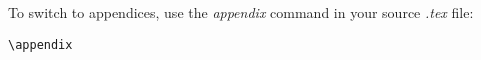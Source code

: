 To switch to appendices, use the \emph{appendix} command in your source \emph{.tex} file:

\begin{lstlisting}
\appendix


\end{lstlisting}